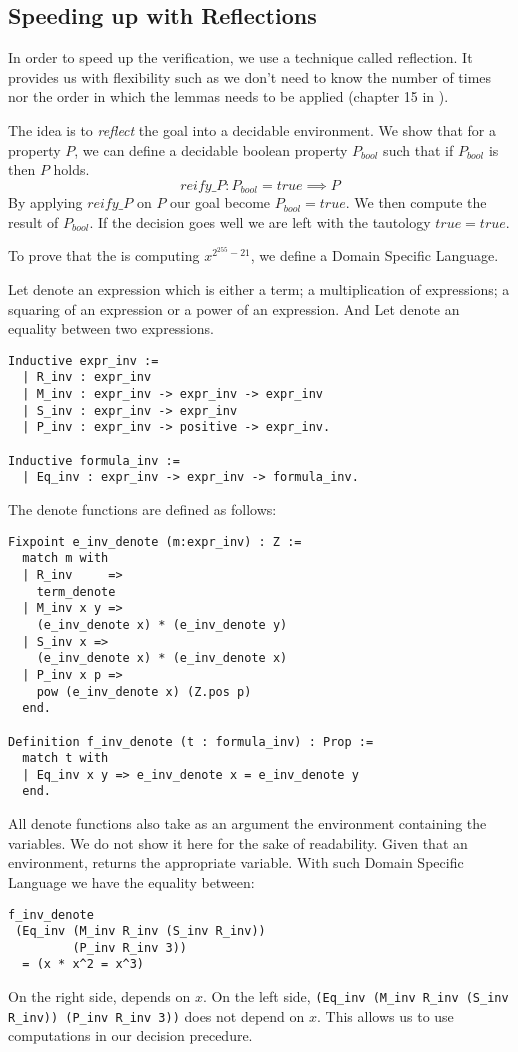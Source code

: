 \subsection{Speeding up with Reflections}

In order to speed up the verification, we use a technique called reflection.
It provides us with flexibility such as we don't need to know the number of
times nor the order in which the lemmas needs to be applied (chapter 15 in \cite{CpdtJFR}).

The idea is to \textit{reflect} the goal into a decidable environment.
We show that for a property $P$, we can define a decidable boolean property
$P_{bool}$ such that if $P_{bool}$ is  then $P$ holds.
$$reify\_P : P_{bool} = true \implies P$$
By applying $reify\_P$ on $P$ our goal become $P_{bool} = true$.
We then compute the result of $P_{bool}$. If the decision goes well we are
left with the tautology $true = true$.

To prove that the  is computing $x^{2^{255}-21}$,
we define a Domain Specific Language.
\begin{definition}
Let  denote an expression which is either a term;
a multiplication of expressions; a squaring of an expression or a power of an expression.
And Let  denote an equality between two expressions.
\end{definition}
\begin{lstlisting}[language=Coq]
Inductive expr_inv :=
  | R_inv : expr_inv
  | M_inv : expr_inv -> expr_inv -> expr_inv
  | S_inv : expr_inv -> expr_inv
  | P_inv : expr_inv -> positive -> expr_inv.

Inductive formula_inv :=
  | Eq_inv : expr_inv -> expr_inv -> formula_inv.
\end{lstlisting}
The denote functions are defined as follows:
\begin{lstlisting}[language=Coq]
Fixpoint e_inv_denote (m:expr_inv) : Z :=
  match m with
  | R_inv     =>
    term_denote
  | M_inv x y =>
    (e_inv_denote x) * (e_inv_denote y)
  | S_inv x =>
    (e_inv_denote x) * (e_inv_denote x)
  | P_inv x p =>
    pow (e_inv_denote x) (Z.pos p)
  end.

Definition f_inv_denote (t : formula_inv) : Prop :=
  match t with
  | Eq_inv x y => e_inv_denote x = e_inv_denote y
  end.
\end{lstlisting}
All denote functions also take as an argument the environment containing the variables.
We do not show it here for the sake of readability.
Given that an environment,  returns the appropriate variable.
With such Domain Specific Language we have the equality between:
\begin{lstlisting}[backgroundcolor=\color{white}]
f_inv_denote
 (Eq_inv (M_inv R_inv (S_inv R_inv))
         (P_inv R_inv 3))
  = (x * x^2 = x^3)
\end{lstlisting}
On the right side,  depends on $x$. On the left side,
\texttt{(Eq\_inv (M\_inv R\_inv (S\_inv R\_inv)) (P\_inv R\_inv 3))} does not depend on $x$.
This allows us to use computations in our decision precedure.

